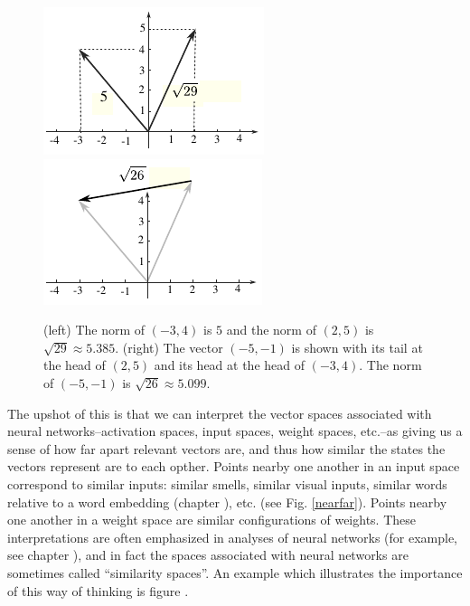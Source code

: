 \begin{figure}[h]
\centering
\includegraphics[scale=1.55]{./images/Norm.pdf}
\qquad
\includegraphics[scale=1.55]{./images/dist.pdf}
\caption{(left) The norm of $(-3,4)$ is $5$ and the norm of $(2,5)$ is 
$\sqrt{29} \approx 5.385$.  (right) The vector $(-5,-1)$ is shown with its tail 
at the head of $(2,5)$ and its head at the head of $(-3,4)$.  The norm of 
$(-5,-1)$ is $\sqrt{26} \approx 5.099$.}
\label{metricfig}
\end{figure}

   The upshot of this is that we can interpret the vector spaces associated 
with neural networks--activation spaces, input spaces, weight spaces, etc.--as 
giving us a sense of how far apart relevant vectors are, and thus how similar 
the states the vectors represent are to each opther.  Points nearby one another 
in an input space correspond to similar inputs: similar smells, similar visual 
inputs, similar words relative to a word embedding (chapter 
), etc. (see Fig. \ref{nearfar}).  Points nearby one 
another in a weight space are similar configurations of weights.  These 
interpretations are often emphasized in analyses of neural networks (for 
example, see chapter ), and in fact the spaces 
associated with neural networks are sometimes called ``similarity spaces''.  An 
example which illustrates the importance of this way of thinking is figure 
.

